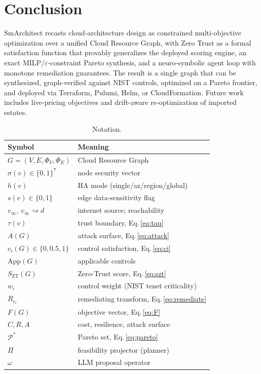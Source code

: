 \documentclass[journal]{IEEEtran}
\theoremstyle{plain}
\theoremstyle{definition}
\newcommand{\G}{G}
\newcommand{\Szt}{S_{\mathrm{ZT}}}
\newcommand{\App}{\mathrm{App}}
\newcommand{\reach}{\rightsquigarrow}
\begin{document}
\section{Conclusion}\label{sec:conclusion}
SmArchitect recasts cloud-architecture design as constrained multi-objective
optimization over a unified Cloud Resource Graph, with Zero Trust as a formal
satisfaction function that provably generalizes the deployed scoring engine, an
exact MILP/$\varepsilon$-constraint Pareto synthesis, and a neuro-symbolic agent
loop with monotone remediation guarantees. The result is a single graph that can
be synthesized, graph-verified against NIST controls, optimized on a Pareto
frontier, and deployed via Terraform, Pulumi, Helm, or CloudFormation. Future
work includes live-pricing objectives and drift-aware re-optimization of
imported estates.

\begin{table}[t]
\caption{Notation.}
\label{tab:notation}
\centering\footnotesize
\begin{tabular}{@{}ll@{}}
\toprule
Symbol & Meaning\\
\midrule
$\G=(V,E,\Phi_V,\Phi_E)$ & Cloud Resource Graph\\
$\sigma(v)\in\{0,1\}^7$ & node security vector\\
$h(v)$ & HA mode (single/az/region/global)\\
$s(e)\in\{0,1\}$ & edge data-sensitivity flag\\
$v_\infty$, $v_\infty\reach d$ & internet source; reachability\\
$\tau(v)$ & trust boundary, Eq.\,\eqref{eq:tau}\\
$A(\G)$ & attack surface, Eq.\,\eqref{eq:attack}\\
$c_i(\G)\in\{0,0.5,1\}$ & control satisfaction, Eq.\,\eqref{eq:ci}\\
$\App(\G)$ & applicable controls\\
$\Szt(\G)$ & Zero-Trust score, Eq.\,\eqref{eq:szt}\\
$w_i$ & control weight (NIST tenet criticality)\\
$R_{c_i}$ & remediating transform, Eq.\,\eqref{eq:remediate}\\
$F(\G)$ & objective vector, Eq.\,\eqref{eq:F}\\
$C,R,A$ & cost, resilience, attack surface\\
$\mathcal{P}^*$ & Pareto set, Eq.\,\eqref{eq:pareto}\\
$\Pi$ & feasibility projector (planner)\\
$\omega$ & LLM proposal operator\\
\bottomrule
\end{tabular}
\end{table}
\end{document}
